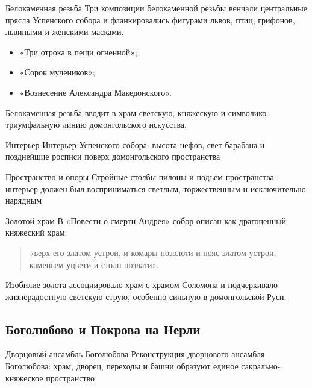 \begin{frame}{Белокаменная резьба}
  Три композиции белокаменной резьбы венчали центральные прясла
  Успенского собора и фланкировались фигурами львов, птиц,
  грифонов, львиными и женскими масками.

  \begin{itemize}
    \item «Три отрока в пещи огненной»;
    \item «Сорок мучеников»;
    \item «Вознесение Александра Македонского».
  \end{itemize}

  Белокаменная резьба вводит в храм светскую, княжескую и
  символико-триумфальную линию домонгольского искусства.
\end{frame}

\begin{frame}{Интерьер}
    {Интерьер Успенского собора:
     высота нефов, свет барабана и позднейшие росписи
     поверх домонгольского пространства}
\end{frame}

\begin{frame}{Пространство и опоры}
    {Стройные столбы-пилоны и подъем пространства:
     интерьер должен был восприниматься светлым,
     торжественным и исключительно нарядным}
\end{frame}

\begin{frame}{Золотой храм}
  В «Повести о смерти Андрея» собор описан как драгоценный
  княжеский храм:
  \begin{quote}
    «верх его златом устрои, и комары позолоти и пояс златом устрои,
    каменьем уцвети и столп позлати».
  \end{quote}

  Изобилие золота ассоциировало храм с храмом Соломона
  и подчеркивало жизнерадостную светскую струю, особенно сильную
  в домонгольской Руси.
\end{frame}

\subsection{Боголюбово и Покрова на Нерли}

\begin{frame}{Дворцовый ансамбль Боголюбова}
    {Реконструкция дворцового ансамбля Боголюбова:
     храм, дворец, переходы и башни образуют единое
     сакрально-княжеское пространство}
\end{frame}

